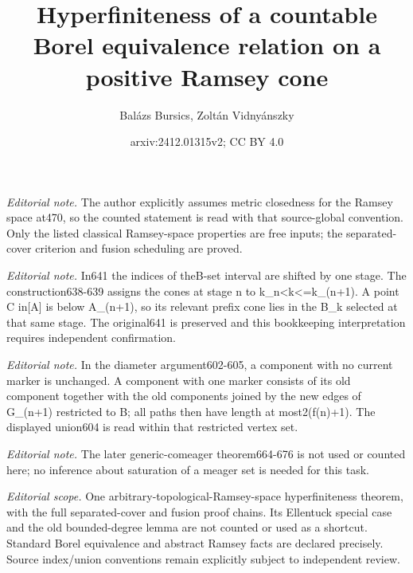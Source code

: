 \documentclass[10pt,a4paper]{amsart}
\title{Hyperfiniteness of a countable Borel equivalence relation on a positive Ramsey cone}
\author{Balázs Bursics, Zoltán Vidnyánszky}
\date{arxiv:2412.01315v2; CC BY 4.0}
\theoremstyle{definition}
\begin{document}
\maketitle
\noindent\textit{Editorial note.} The author explicitly assumes metric closedness for the Ramsey space at470, so the counted statement is read with that source-global convention. Only the listed classical Ramsey-space properties are free inputs; the separated-cover criterion and fusion scheduling are proved.\par\medskip
\noindent\textit{Editorial note.} In641 the indices of theB-set interval are shifted by one stage. The construction638-639 assigns the cones at stage n to k\_n<k<=k\_(n+1). A point C in[A] is below A\_(n+1), so its relevant prefix cone lies in the B\_k selected at that same stage. The original641 is preserved and this bookkeeping interpretation requires independent confirmation.\par\medskip
\noindent\textit{Editorial note.} In the diameter argument602-605, a component with no current marker is unchanged. A component with one marker consists of its old component together with the old components joined by the new edges of G\_(n+1) restricted to B; all paths then have length at most2(f(n)+1). The displayed union604 is read within that restricted vertex set.\par\medskip
\noindent\textit{Editorial note.} The later generic-comeager theorem664-676 is not used or counted here; no inference about saturation of a meager set is needed for this task.\par\medskip
\noindent\textit{Editorial scope.} One arbitrary-topological-Ramsey-space hyperfiniteness theorem, with the full separated-cover and fusion proof chains. Its Ellentuck special case and the old bounded-degree lemma are not counted or used as a shortcut. Standard Borel equivalence and abstract Ramsey facts are declared precisely. Source index/union conventions remain explicitly subject to independent review.\par\medskip
\end{document}
